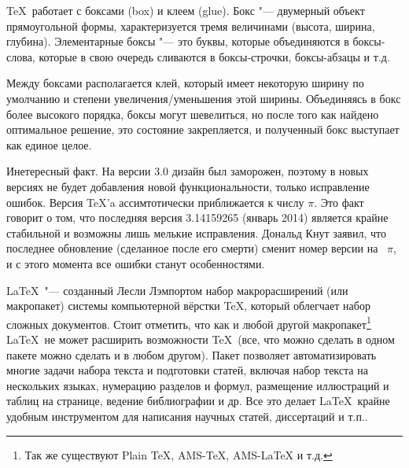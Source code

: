 \documentclass{article}
\begin{document}
			\TeX ~работает с боксами (box) и клеем (glue). Бокс "--- двумерный объект прямоугольной формы, характеризуется тремя 
		величинами (высота, ширина, глубина). Элементарные боксы "--- это буквы, которые объединяются в боксы-слова, которые в 				свою очередь сливаются в боксы-строчки, боксы-абзацы и т.д.

        	Между боксами располагается клей, который имеет некоторую ширину по умолчанию и степени увеличения/уменьшения этой 				ширины. Объединяясь в бокс более высокого порядка, боксы могут шевелиться, но после того как найдено оптимальное решение, 		это состояние закрепляется, и полученный бокс выступает как единое целое.
        
       		Инетересный факт. На версии 3.0 дизайн был заморожен, поэтому в новых версиях не будет добавления новой 						функциональности, только исправление ошибок. Версия \TeX 'a ассимтотически приближается к числу $\pi$. Это факт говорит о 		том, что последняя версия	3.14159265 (январь 2014) является крайне стабильной и возможны лишь мелькие исправления. 				Дональд Кнут заявил, что последнее обновление (сделанное после его смерти) сменит номер версии на ~$\pi$, и с этого 				момента все ошибки станут особенностями.
        		
			\LaTeX ~"--- созданный Лесли Лэмпортом набор макрорасширений (или макропакет) системы компьютерной вёрстки \TeX, 				который облегчает набор сложных документов. Стоит отметить, что как и любой другой макропакет\footnote{ Так же существуют 		Plain TeX, AMS-TeX, AMS-LaTeX и т.д.} \LaTeX ~не может расширить возможности \TeX ~(все, что можно сделать в одном пакете 		можно сделать и в любом другом). Пакет позволяет автоматизировать многие задачи набора текста и подготовки статей, 					включая набор текста на нескольких языках, нумерацию разделов и формул, размещение иллюстраций и таблиц на странице, 				ведение библиографии и др. Все это делает \LaTeX ~крайне удобным инструментом для написания научных статей, диссертаций и 		т.п..
					
\end{document}
